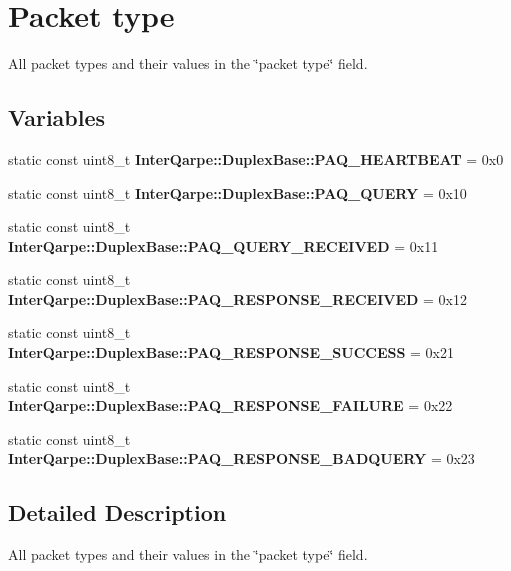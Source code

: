 \hypertarget{group__packet__type}{\section{Packet type}
\label{group__packet__type}
}


All packet types and their values in the \char`\"{}packet type\char`\"{} field.  


\subsection*{Variables}
\begin{DoxyCompactItemize}
\item 
\hypertarget{group__packet__type_gab69f9e397e49b7e4d35c9a489c25de1c}{static const uint8\+\_\+t {\bfseries Inter\+Qarpe\+::\+Duplex\+Base\+::\+P\+A\+Q\+\_\+\+H\+E\+A\+R\+T\+B\+E\+A\+T} = 0x0}\label{group__packet__type_gab69f9e397e49b7e4d35c9a489c25de1c}

\item 
\hypertarget{group__packet__type_ga444aacc172c0c36f34b07d2787797c2a}{static const uint8\+\_\+t {\bfseries Inter\+Qarpe\+::\+Duplex\+Base\+::\+P\+A\+Q\+\_\+\+Q\+U\+E\+R\+Y} = 0x10}\label{group__packet__type_ga444aacc172c0c36f34b07d2787797c2a}

\item 
\hypertarget{group__packet__type_ga93d5db22c925f7e4957d32fcae7af336}{static const uint8\+\_\+t {\bfseries Inter\+Qarpe\+::\+Duplex\+Base\+::\+P\+A\+Q\+\_\+\+Q\+U\+E\+R\+Y\+\_\+\+R\+E\+C\+E\+I\+V\+E\+D} = 0x11}\label{group__packet__type_ga93d5db22c925f7e4957d32fcae7af336}

\item 
\hypertarget{group__packet__type_ga4d03159262b74c2969fc9bec3cbc00bc}{static const uint8\+\_\+t {\bfseries Inter\+Qarpe\+::\+Duplex\+Base\+::\+P\+A\+Q\+\_\+\+R\+E\+S\+P\+O\+N\+S\+E\+\_\+\+R\+E\+C\+E\+I\+V\+E\+D} = 0x12}\label{group__packet__type_ga4d03159262b74c2969fc9bec3cbc00bc}

\item 
\hypertarget{group__packet__type_gac8a7c627e7b77f872b285d06b065c543}{static const uint8\+\_\+t {\bfseries Inter\+Qarpe\+::\+Duplex\+Base\+::\+P\+A\+Q\+\_\+\+R\+E\+S\+P\+O\+N\+S\+E\+\_\+\+S\+U\+C\+C\+E\+S\+S} = 0x21}\label{group__packet__type_gac8a7c627e7b77f872b285d06b065c543}

\item 
\hypertarget{group__packet__type_ga73ed12e9888ca30709f83fb7f1bac787}{static const uint8\+\_\+t {\bfseries Inter\+Qarpe\+::\+Duplex\+Base\+::\+P\+A\+Q\+\_\+\+R\+E\+S\+P\+O\+N\+S\+E\+\_\+\+F\+A\+I\+L\+U\+R\+E} = 0x22}\label{group__packet__type_ga73ed12e9888ca30709f83fb7f1bac787}

\item 
\hypertarget{group__packet__type_gacbae25852f1bb51475c03dd048005633}{static const uint8\+\_\+t {\bfseries Inter\+Qarpe\+::\+Duplex\+Base\+::\+P\+A\+Q\+\_\+\+R\+E\+S\+P\+O\+N\+S\+E\+\_\+\+B\+A\+D\+Q\+U\+E\+R\+Y} = 0x23}\label{group__packet__type_gacbae25852f1bb51475c03dd048005633}

\end{DoxyCompactItemize}


\subsection{Detailed Description}
All packet types and their values in the \char`\"{}packet type\char`\"{} field. 

